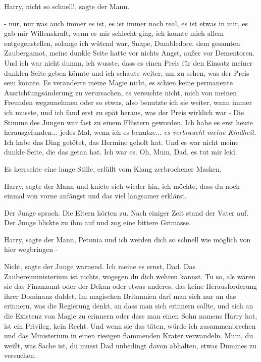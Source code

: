 \glqq{}Harry, nicht so schnell!\grqq{}, sagte der Mann.

\glqq{}- nur, nur was auch immer es ist, es ist immer noch real, es ist etwas in
mir, es gab mir Willenskraft, wenn es mir schlecht ging, ich konnte mich allem
entgegenstellen, solange ich wütend war, Snape, Dumbledore, dem gesamten
Zaubergamot, meine dunkle Seite hatte vor nichts Angst, außer vor Dementoren.
Und ich war nicht dumm, ich wusste, dass es einen Preis für den Einsatz meiner
dunklen Seite geben könnte und ich schaute weiter, um zu sehen, was der Preis
sein könnte. Es veränderte meine Magie nicht, es schien keine permanente
Ausrichtungsänderung zu verursachen, es versuchte nicht, mich von meinen
Freunden wegzunehmen oder so etwas, also benutzte ich sie weiter, wann immer ich
musste, und ich fand erst zu spät heraus, was der Preis wirklich war -\grqq{}
Die Stimme des Jungen war fast zu einem Flüstern geworden. \glqq{}Ich habe es
erst heute herausgefunden... jedes Mal, wenn ich es benutze... \emph{es
verbraucht meine Kindheit}. Ich habe das Ding getötet, das Hermine geholt hat.
Und es war nicht meine dunkle Seite, die das getan hat. Ich war es. Oh, Mum,
Dad, es tut mir leid.\grqq{}

Es herrschte eine lange Stille, erfüllt vom Klang zerbrochener Masken.

\glqq{}Harry\grqq{}, sagte der Mann und kniete sich wieder hin, \glqq{}ich möchte,
dass du noch einmal von vorne anfängst und das viel langsamer erklärst.\grqq{}

Der Junge sprach. Die Eltern hörten zu. Nach einiger Zeit stand der Vater auf.
Der Junge blickte zu ihm auf und zog eine bittere Grimasse.

\glqq{}Harry\grqq{}, sagte der Mann, \glqq{}Petunia und ich werden dich so schnell
wie möglich von hier wegbringen -\grqq{}

\glqq{}Nicht\grqq{}, sagte der Junge warnend. \glqq{}Ich meine es ernst, Dad. Das
Zaubereiministerium ist nichts, wogegen du dich wehren kannst. Tu so, als wären
sie das Finanzamt oder der Dekan oder etwas anderes, das keine Herausforderung
ihrer Dominanz duldet. Im magischen Britannien darf man sich nur an das
erinnern, was die Regierung denkt, an dass man sich erinnern sollte, und sich an
die Existenz von Magie zu erinnern oder dass man einen Sohn namens Harry hat,
ist ein Privileg, kein Recht. Und wenn sie das täten, würde ich zusammenbrechen
und das Ministerium in einen riesigen flammenden Krater verwandeln. Mum, du
weißt, was Sache ist, du musst Dad unbedingt davon abhalten, etwas Dummes zu
versuchen.\grqq{}

